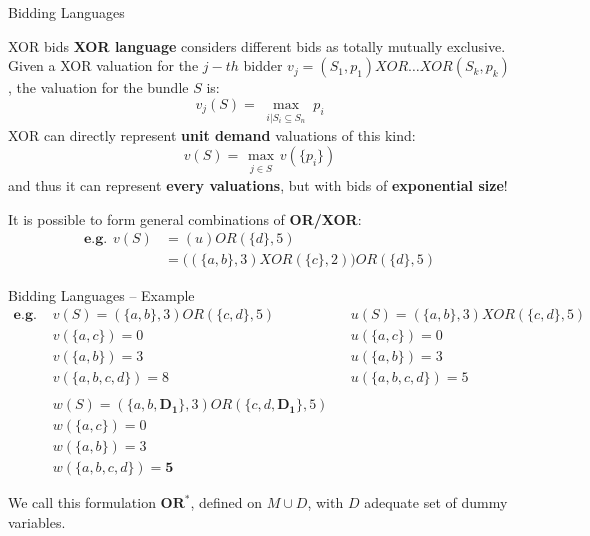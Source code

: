 \documentclass[aspectratio=169,xcolor=dvipsnames]{beamer}
\begin{document}
    \begin{frame}{Bidding Languages}
    
    \begin{block}{XOR bids}
    \textbf{XOR language} considers different bids as totally mutually exclusive. Given a XOR valuation for the $j-th$ bidder $v_j = (S_1,p_{1})XOR  \dotsc XOR  (S_k,p_{k})$, the valuation for the bundle $S$ is:  
    $$
    v_j (S) = \max_{\substack{i | S_i \subseteq S_n}} p_i
    $$
    XOR can directly represent \textbf{unit demand} valuations of this kind:
    $$
    v (S) = \max_{\substack{j \in S}} v(\{p_i\})
    $$
    and thus it can represent \textbf{every valuations}, but with bids of \textbf{exponential size}!
    \end{block}
    It is possible to form general combinations of \textbf{OR/XOR}:
    \begin{align*}
       \boldsymbol{e.g.} \hspace{5pt}  v(S) &= (u)OR (\{d\},5)\\
                              &= \big( (\{a,b\},3)XOR (\{c\},2) \big)OR (\{d\},5)
    \end{align*}
    \end{frame}
    \begin{frame}{Bidding Languages – Example}
    \vspace{-30pt}
    \begin{align*}
      \boldsymbol{e.g.}  \hspace{4pt} & v(S) = (\{a,b\},3)OR(\{c,d\},5)   &&u(S) = (\{a,b\},3)XOR(\{c,d\},5) \\
                        & v(\{a,c\}) = 0 &&u(\{a,c\}) = 0 \\
                        & v(\{a,b\}) = 3 &&u(\{a,b\}) = 3 \\
                        & v(\{a,b,c,d\}) = 8 && u(\{a,b,c,d\})=5 \\
                          & \\
                        & w(S)= (\{a,b,\boldsymbol{D_{1}}\},3)OR(\{c,d,\boldsymbol{D_{1}}\},5)\\
                        & w(\{a,c\}) = 0 \\
                        & w(\{a,b\}) = 3 \\
                        & w(\{a,b,c,d\}) = \mathbf{5}
    \end{align*}

    We call this formulation $\mathbf{OR^*}$, defined on $M \cup D$, with $D$ adequate set of dummy variables.
    \end{frame}
    
\end{document}
